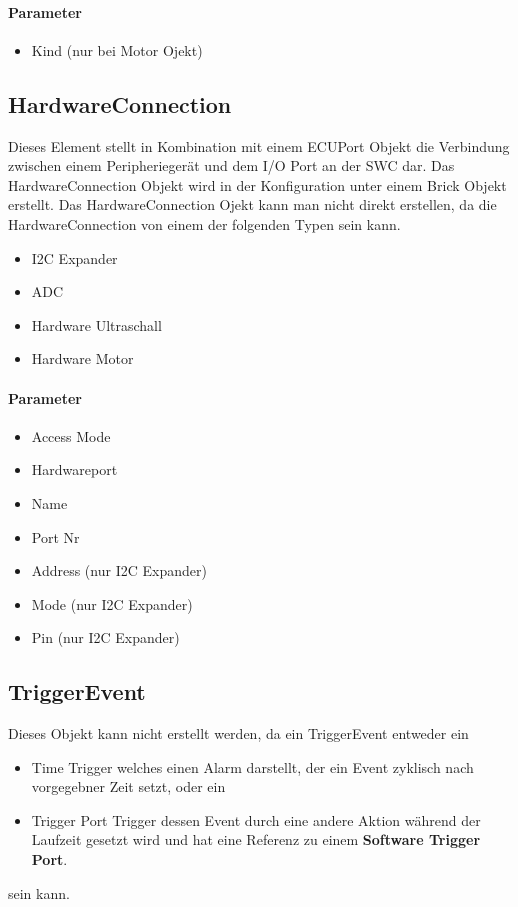 \paragraph{Parameter}
\begin{itemize}
\item Kind (nur bei Motor Ojekt)
\end{itemize}


\subsection{HardwareConnection}
Dieses Element stellt in Kombination mit einem \frqq{}ECUPort\flqq{} Objekt die Verbindung zwischen einem Peripheriegerät und dem I/O Port an der SWC dar. Das \frqq{}HardwareConnection\flqq{} Objekt wird in der Konfiguration unter einem \frqq{}Brick\flqq{} Objekt erstellt. Das \frqq{}HardwareConnection\flqq{} Ojekt kann man nicht direkt erstellen, da die \frqq{}HardwareConnection\flqq{} von einem der folgenden Typen sein kann.
\begin{itemize}
\item \frqq{}I2C Expander\flqq{}
\item \frqq{}ADC\flqq{}
\item \frqq{}Hardware Ultraschall\flqq{}
\item \frqq{}Hardware Motor\flqq{}
\end{itemize}
\paragraph{Parameter}
\begin{itemize}
\item Access Mode
\item Hardwareport
\item Name
\item Port Nr
\item Address (nur I2C Expander)
\item Mode (nur I2C Expander)
\item Pin (nur I2C Expander)
\end{itemize}

\subsection{TriggerEvent}
Dieses Objekt kann nicht erstellt werden, da ein \frqq{}TriggerEvent\flqq{} entweder ein
\begin{itemize}
\item \frqq{}Time Trigger\flqq{}
welches einen Alarm darstellt, der ein Event zyklisch nach vorgegebner Zeit setzt, oder ein
\item \frqq{}Trigger Port Trigger\flqq{}
dessen Event durch eine andere Aktion während der Laufzeit gesetzt wird und hat eine Referenz zu einem \textbf{Software \frqq{}Trigger Port\flqq{}}.
\end{itemize}
sein kann.
